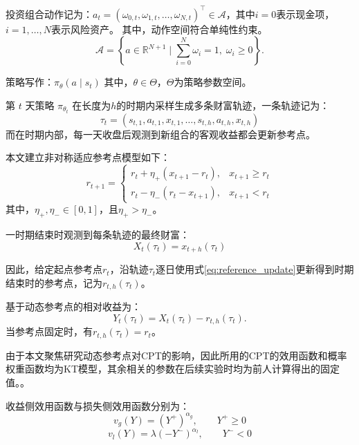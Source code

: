 \documentclass{sufethesismas}
\begin{document}
投资组合动作记为：$a_t=(\omega_{0,t},\omega_{1,t},\ldots,\omega_{N,t})^\top\in \mathcal{A}$，其中$i=0$表示现金项，$i=1,\dots,N$表示风险资产。
其中，动作空间符合单纯性约束。
\begin{equation*}
\mathcal{A}=\left\{a\in \mathbb{R}^{N+1} \mid \sum_{i=0}^N \omega_i=1,\; \omega_i\ge 0\right\}.
\end{equation*}

策略写作：$\pi_\theta(a\mid s_t)$
其中，$\theta\in\Theta$，$\Theta$为策略参数空间。

第 $t$ 天策略 $\pi_{\theta_t}$ 在长度为$h$的时期内采样生成多条财富轨迹，一条轨迹记为：
\begin{equation*}
\tau_t=(s_{t,1},a_{t,1},x_{t,1},\ldots,s_{t,h},a_{t,h},x_{t,h})
\end{equation*}
而在时期内部，每一天收盘后观测到新组合的客观收益都会更新参考点。

本文建立非对称适应参考点模型如下：
\begin{equation}
\label{eq:reference_update}
r_{t+1}
=
\begin{cases}
r_t+\eta_+\left(x_{t+1}-r_t\right), & x_{t+1}\ge r_t\\[4pt]
r_t-\eta_-\left(r_t-x_{t+1}\right), & x_{t+1}<r_t
\end{cases}
\end{equation}
其中，$\eta_+,\eta_-\in[0,1]$，且$\eta_+ >\eta_-$。

一时期结束时观测到每条轨迹的最终财富：
\begin{equation}
X_t(\tau_t)=x_{t+h}(\tau_t)
\end{equation}

因此，给定起点参考点$r_t$，沿轨迹$\tau_t$逐日使用式\eqref{eq:reference_update}更新得到时期结束时的参考点，记为$r_{t,h}(\tau_t)$。

基于动态参考点的相对收益为：
\begin{equation}
Y_t(\tau_t)=X_t(\tau_t)-r_{t,h}(\tau_t).
\end{equation}
当参考点固定时，有$r_{t,h}(\tau_t)=r_t$。

由于本文聚焦研究动态参考点对CPT的影响，因此所用的CPT的效用函数和概率权重函数均为KT模型，其余相关的参数在后续实验时均为前人计算得出的固定值。\citep{kahneman1979prospect}。

收益侧效用函数与损失侧效用函数分别为：
\begin{equation}
v_g(Y)
=(Y^+)^{\alpha_g},
\qquad
Y^+\ge 0
\end{equation}
\begin{equation}
v_l(Y)
=\lambda (-Y^-)^{\alpha_l},  
\qquad
Y^-<0
\end{equation}
\end{document}
